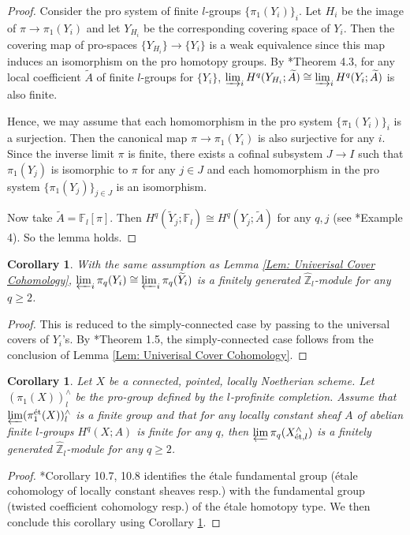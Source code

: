 \documentclass[11pt]{amsart}
\newtheorem{corollary}[theorem]{Corollary}
\theoremstyle{definition}
\numberwithin{equation}{section}
\numberwithin{equation}{section}
\newcommand\ZZ{\mathbb{Z}}
\newcommand\FF{\mathbb{F}}
\DeclareMathOperator{\et}{\acute{e}t}
\begin{document}
\begin{proof}
Consider the pro system of finite $l$-groups $\{\pi_1(Y_i)\}_i$. Let $H_i$ be the image of $\pi\rightarrow \pi_1(Y_i)$ and let $Y_{H_i}$ be the corresponding covering space of $Y_i$. Then the covering map of pro-spaces $\{Y_{H_i}\}\rightarrow \{Y_i\}$ is a weak equivalence since this map induces an isomorphism on the pro homotopy groups. By \cite{artin-mazur-etale-homotopy}*{Theorem 4.3}, for any local coefficient $\widetilde{A}$ of finite $l$-groups for $\{Y_i\}$, $\varinjlim_i H^q(Y_{H_i};\widetilde{A})\cong \varinjlim_i H^q(Y_i;\widetilde{A})$ is also finite.

Hence, we may assume that each homomorphism in the pro system $\{\pi_1(Y_i)\}_i$ is a surjection. Then the canonical map $\pi\rightarrow \pi_1(Y_i)$ is also surjective for any $i$. Since the inverse limit $\pi$ is finite, there exists a cofinal subsystem $J\rightarrow I$ such that $\pi_1(Y_j)$ is isomorphic to $\pi$ for any $j\in J$ and each homomorphism in the pro system $\{\pi_1(Y_j)\}_{j\in J}$ is an isomorphism.

Now take $\widetilde{A}=\FF_l[\pi]$. Then $H^q(\widetilde{Y}_j;\FF_l)\cong H^q(Y_j;\widetilde{A})$ for any $q,j$ (see \cite{May-local-coefficient}*{Example 4}). So the lemma holds.
\end{proof}


\begin{corollary}\label{cor: pi q fin gen}
With the same assumption as Lemma \ref{Lem: Univerisal Cover Cohomology}, $\varprojlim_i \pi_q(Y_i)\cong \varprojlim_i \pi_q(\widetilde{Y}_i)$ is a finitely generated $\widehat{\ZZ}_l$-module for any $q\geq 2$.
\end{corollary}

\begin{proof}
This is reduced to the simply-connected case by passing to the universal covers of $Y_i$'s.
By \cite{Hu-Zhang-formal-manifold}*{Theorem 1.5}, the simply-connected case follows from the conclusion of Lemma \ref{Lem: Univerisal Cover Cohomology}.
\end{proof}

\begin{corollary}\label{cor: finite gen piq}
Let $X$ be a connected, pointed, locally Noetherian scheme. Let $(\pi^{\et}_1(X))^{\wedge}_l$ be the pro-group defined by the $l$-profinite completion.  Assume that $\varprojlim (\pi^{\et}_1(X))^{\wedge}_l$ is a finite group and that for any locally constant sheaf $A$ of abelian finite $l$-groups $H^{q}_{\et}(X;A)$ is finite for any $q$, then $\varprojlim \pi_q(X^{\wedge}_{\et,l})$ is a finitely generated $\widehat{\ZZ}_l$-module for any $q\geq 2$.
\end{corollary}
\begin{proof}
    \cite{artin-mazur-etale-homotopy}*{Corollary 10.7, 10.8} identifies the \'etale fundamental group (\'etale cohomology of locally constant sheaves resp.) with the fundamental group (twisted coefficient cohomology resp.) of the \'etale homotopy type. We then conclude this corollary using Corollary \ref{cor: pi q fin gen}.
\end{proof}
\end{document}
